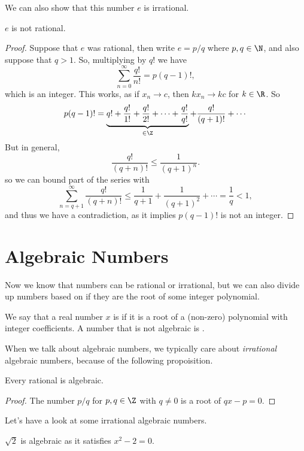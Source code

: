 \documentclass[a4paper]{scrreprt}
\begin{document}
We can also show that this number $e$ is irrational.

\begin{theorem}[Irrationality of $e$]
	$e$ is not rational.
\end{theorem}
\begin{proof}
	Suppose that $e$ was rational, then write $e = p/q$ where $p, q \in \N$, and also suppose that $q > 1$. So, multiplying by $q!$ we have
	$$
\sum_{n = 0}^{\infty} \frac{q!}{n!} = p(q - 1)!,
	$$
	which is an integer. This works, as if $x_n \rightarrow c$, then $k x_n \rightarrow kc$ for $k \in \R$. So
	$$
	p(q - 1)! = \underbrace{q! + \frac{q!}{1!}+ \frac{q!}{2!} + \dots +\frac{q!}{q!}}_{\in \Z} + \frac{q!}{(q+1)!} + \cdots
	$$
	But in general,
	$$
	\frac{q!}{(q + n)!} \leq \frac{1}{(q + 1)^n}.
	$$
	so we can bound part of the series with
	$$
	\sum_{n = q + 1}^\infty \frac{q!}{(q + n)!} \leq \frac{1}{q + 1} + \frac{1}{(q + 1)^2} + \cdots = \frac{1}{q} < 1,
	$$
	and thus we have a contradiction, as it implies $p(q - 1)!$ is not an integer.
\end{proof}

\section{Algebraic Numbers}

Now we know that numbers can be rational or irrational, but we can also divide up numbers based on if they are the root of some integer polynomial.

\begin{definition}[Algebraic]
We say that a real number $x$ is  if it is a root of a (non-zero) polynomial with integer coefficients. A number that is not algebraic is .	
\end{definition}

When we talk about algebraic numbers, we typically care about \emph{irrational} algebraic numbers, because of the following propoisition.

\begin{proposition}
	Every rational is algebraic.
\end{proposition}
\begin{proof}
	The number $p/q$ for $p, q \in \Z$ with $q \neq 0$ is a root of $qx - p = 0$.
\end{proof}

Let's have a look at some irrational algebraic numbers.

\begin{example}
	$\sqrt{2}$ is algebraic as it satisfies $x^2 - 2 = 0$.
\end{example}
\end{document}
